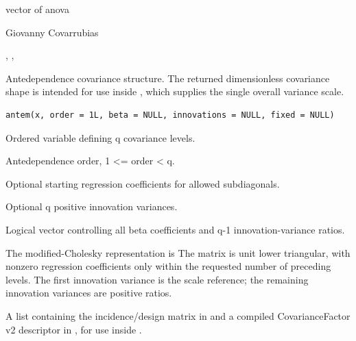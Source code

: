 \documentclass[a4paper]{book}
\begin{document}
%
\begin{Value}
vector of anova

\end{Value}
%
\begin{Author}\relax
Giovanny Covarrubias
\end{Author}
%
\begin{SeeAlso}\relax
{}, , 
\end{SeeAlso}
%
\begin{Description}\relax
Antedependence covariance structure. The returned dimensionless covariance shape is intended for use inside , which supplies the single overall variance scale.
\end{Description}
%
\begin{Usage}
\begin{verbatim}
antem(x, order = 1L, beta = NULL, innovations = NULL, fixed = NULL)
\end{verbatim}
\end{Usage}
%
\begin{Arguments}
\begin{ldescription}
\item[\code{x}] Ordered variable defining q covariance levels.
\item[\code{order}] Antedependence order, 1 <= order < q.
\item[\code{beta}] Optional starting regression coefficients for allowed subdiagonals.
\item[\code{innovations}] Optional q positive innovation variances.
\item[\code{fixed}] Logical vector controlling all beta coefficients and q-1 innovation-variance ratios.
\end{ldescription}
\end{Arguments}
%
\begin{Details}\relax
The modified-Cholesky representation is  The matrix  is unit lower triangular, with nonzero regression coefficients only within the requested number of preceding levels.  The first innovation variance is the scale reference; the remaining innovation variances are positive ratios.
\end{Details}
%
\begin{Value}
A list containing the incidence/design matrix in  and a compiled CovarianceFactor v2 descriptor in , for use inside .
\end{Value}
\end{document}
